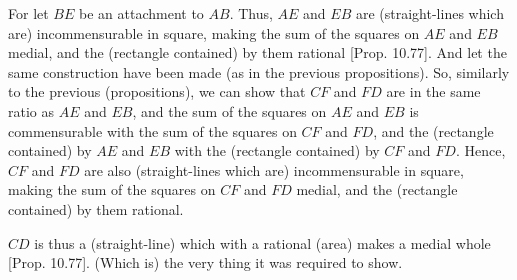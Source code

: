 \begin{Parallel}{}{}
{For let $BE$ be an attachment to $AB$. Thus, $AE$ and
$EB$ are (straight-lines which are) incommensurable in square, making the sum of the
squares on $AE$ and $EB$ medial,  and the (rectangle contained)
by them rational [Prop. 10.77]. 
And let the same construction have been made (as in the previous propositions).
So, similarly
to the previous  (propositions), we can  show that $CF$ and $FD$
are in the same ratio as $AE$ and $EB$, and the sum of the squares
on $AE$ and $EB$ is commensurable with the sum of the squares on
$CF$ and $FD$, and the (rectangle contained) by $AE$ and $EB$
with the (rectangle contained) by $CF$ and $FD$. Hence, $CF$ and
$FD$ are also (straight-lines which are) incommensurable in square, making the sum of the
squares on $CF$ and $FD$ medial, and the (rectangle contained) by them
rational.

$CD$ is thus a (straight-line) which with a rational (area) makes a
medial whole [Prop. 10.77]. (Which is)
the very thing it was required to show.}
\end{Parallel}

